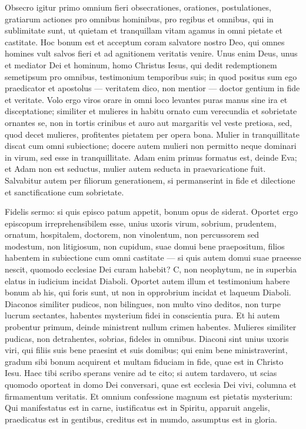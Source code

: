 \begin{biblechapter} 
\verse Obsecro igitur primo omnium fieri obsecrationes, orationes, postulationes, gratiarum actiones pro omnibus hominibus, 
\verse pro regibus et omnibus, qui in sublimitate sunt, ut quietam et tranquillam vitam agamus in omni pietate et castitate. 
\verse Hoc bonum est et acceptum coram salvatore nostro Deo,  
\verse qui omnes homines vult salvos fieri et ad agnitionem veritatis venire. 
\verse Unus enim Deus, unus et mediator Dei et hominum, homo Christus Iesus,  
\verse qui dedit redemptionem semetipsum pro omnibus, testimonium temporibus suis; 
\verse in quod positus sum ego praedicator et apostolus — veritatem dico, non mentior — doctor gentium in fide et veritate. 
\verse Volo ergo viros orare in omni loco levantes puras manus sine ira et disceptatione; 
\verse similiter et mulieres in habitu ornato cum verecundia et sobrietate ornantes se, non in tortis crinibus et auro aut margaritis vel veste pretiosa, 
\verse sed, quod decet mulieres, profitentes pietatem per opera bona. 
\verse Mulier in tranquillitate discat cum omni subiectione; 
\verse docere autem mulieri non permitto neque dominari in virum, sed esse in tranquillitate.  
\verse Adam enim primus formatus est, deinde Eva; 
\verse et Adam non est seductus, mulier autem seducta in praevaricatione fuit. 
\verse Salvabitur autem per filiorum generationem, si permanserint in fide et dilectione et sanctificatione cum sobrietate. 
\end{biblechapter}

\begin{biblechapter} 
\verse Fidelis sermo: si quis episco patum appetit, bonum opus de siderat. 
\verse Oportet ergo episcopum irreprehensibilem esse, unius uxoris virum, sobrium, prudentem, ornatum, hospitalem, doctorem, 
\verse non vinolentum, non percussorem sed modestum, non litigiosum, non cupidum, 
\verse suae domui bene praepositum, filios habentem in subiectione cum omni castitate 
\verse — si quis autem domui suae praeesse nescit, quomodo ecclesiae Dei curam habebit? C, 
\verse non neophytum, ne in superbia elatus in iudicium incidat Diaboli.  
\verse Oportet autem illum et testimonium habere bonum ab his, qui foris sunt, ut non in opprobrium incidat et laqueum Diaboli. 
\verse Diaconos similiter pudicos, non bilingues, non multo vino deditos, non turpe lucrum sectantes, 
\verse habentes mysterium fidei in conscientia pura. 
\verse Et hi autem probentur primum, deinde ministrent nullum crimen habentes.  
\verse Mulieres similiter pudicas, non detrahentes, sobrias, fideles in omnibus.  
\verse Diaconi sint unius uxoris viri, qui filiis suis bene praesint et suis domibus; 
\verse qui enim bene ministraverint, gradum sibi bonum acquirent et multam fiduciam in fide, quae est in Christo Iesu. 
\verse Haec tibi scribo sperans venire ad te cito; 
\verse si autem tardavero, ut scias quomodo oporteat in domo Dei conversari, quae est ecclesia Dei vivi, columna et firmamentum veritatis. 
\verse Et omnium confessione magnum est pietatis mysterium: Qui manifestatus est in carne, iustificatus est in Spiritu, apparuit angelis, praedicatus est in gentibus, creditus est in mumdo, assumptus est in gloria. 
\end{biblechapter}

